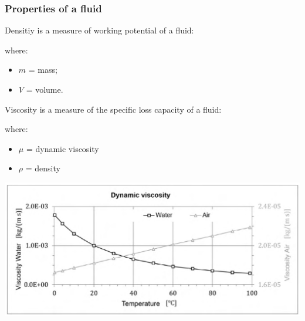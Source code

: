 \documentclass{article}
\begin{document}
\subsubsection{Properties of a fluid}
Densitiy is a measure of working potential of a fluid:

where:
\begin{itemize}
    \item $m$ = mass;
    \item $V$ = volume.
\end{itemize}

Viscosity is a measure of the specific loss capacity of a fluid:
\figbox{$\nu \triangleq \dfrac{\mu}{\rho}\ \left[\dfrac{N\cdot s}{m^2} = Pa\cdot s\right]$}

where:
\begin{itemize}
    \item $\mu$ = dynamic viscosity
    \item $\rho$ = density
\end{itemize}

\begin{center}
    \includegraphics[width=.74\textwidth]{media/viscosity.png}
\end{center}

\end{document}
